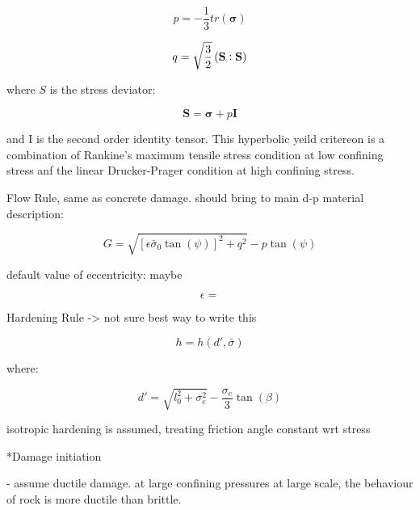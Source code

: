 \begin{equation}
p=-\frac{1}{3}tr\left(\boldsymbol{\sigma}\right)\label{eqn:druc3}
\end{equation}


\begin{equation}
q=\sqrt{\frac{3}{2}}\left(\mathbf{S}\vcentcolon\mathbf{S}\right)\label{eqn:druc4}
\end{equation}


where $S$ is the stress deviator:

\begin{equation}
\mathbf{S}=\boldsymbol{\sigma}+p\mathbf{I}\label{eqn:druc4-1}
\end{equation}


and I is the second order identity tensor. This hyperbolic yeild critereon
is a combination of Rankine's maximum tensile stress condition at
low confining stress anf the linear Drucker-Prager condition at high
confining stress.

Flow Rule, same as concrete damage. should bring to main d-p material
description:

\begin{equation}
G=\sqrt{\left[\epsilon\bar{\sigma}_{0}\tan\left(\psi\right)\right]^{2}+q^{2}}-p\tan\left(\psi\right)\label{eqn:druc5}
\end{equation}


default value of eccentricity: maybe

\begin{equation}
\epsilon=\label{eqn:druc5-1}
\end{equation}


Hardening Rule -> not sure best way to write this

\begin{equation}
h=h\left(d',\bar{\sigma}\right)\label{eqn:druc6}
\end{equation}


where:

\begin{equation}
d'=\sqrt{l_{0}^{2}+\sigma_{c}^{2}}-\frac{\sigma_{c}}{3}\tan\left(\beta\right)\label{eqn:druc6-1}
\end{equation}


isotropic hardening is assumed, treating friction angle constant wrt
stress

{*}Damage initiation

- assume ductile damage. at large confining pressures at large scale,
the behaviour of rock is more ductile than brittle.

